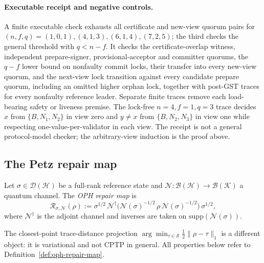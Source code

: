 \paragraph{Executable receipt and negative controls.}
A finite executable check exhausts all certificate and new-view quorum pairs
for \((n,f,q)=(1,0,1),(4,1,3),(6,1,4),(7,2,5)\); the third checks the
general threshold with \(q<n-f\). It checks the certificate-overlap witness,
independent prepare-signer, provisional-acceptor and committer quorums, the
\(q-f\) lower bound on nonfaulty commit locks, their transfer into every
new-view quorum, and the next-view lock transition against every candidate
prepare quorum, including an omitted higher orphan lock, together with
post-GST traces for every nonfaulty reference leader. Separate finite traces
remove each load-bearing safety or liveness premise. The lock-free
\(n=4,f=1,q=3\) trace decides \(x\) from \(\{B,N_1,N_2\}\) in view zero and
\(y\ne x\) from \(\{B,N_2,N_3\}\) in view one while respecting
one-value-per-validator in each view. The receipt is not a general
protocol-model checker; the arbitrary-view induction is the proof above.

\subsection*{The Petz repair map}

\begin{definition}
\label{def:oph-repair-map}
Let $\sigma\in\mathcal{D}(\mathcal{H})$ be a full-rank reference state and
$\mathcal{N}:\mathcal{B}(\mathcal{H})\to\mathcal{B}(\mathcal{K})$ a quantum channel.
The \emph{OPH repair map} is
\[
  \mathcal{R}_{\sigma,\mathcal{N}}(\rho)
  := \sigma^{1/2}\,
     \mathcal{N}^\dagger\!\bigl(
       \mathcal{N}(\sigma)^{-1/2}\,\rho\,\mathcal{N}(\sigma)^{-1/2}
     \bigr)
     \,\sigma^{1/2},
\]
where $\mathcal{N}^\dagger$ is the adjoint channel and inverses are
taken on $\mathrm{supp}(\mathcal{N}(\sigma))$.
\end{definition}

The closest-point trace-distance projection
\(\arg\min_{\tau\in\mathcal S}\tfrac12\|\rho-\tau\|_1\) is a different object:
it is variational and not CPTP in general. All properties below refer to
Definition~\ref{def:oph-repair-map}.

